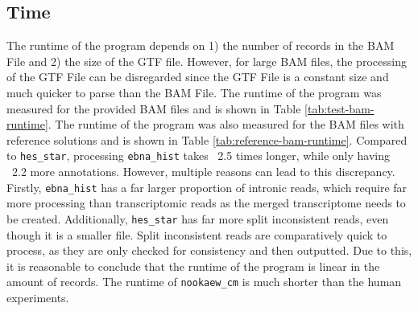 \documentclass{article}
\begin{document}
    \subsection{Time}
    The runtime of the program depends on 1) the number of records in the BAM File and 2) the size of the GTF file. However, for large BAM files, the processing of the GTF File can be disregarded since the GTF File is a constant size and much quicker to parse than the BAM File. The runtime of the program was measured for the provided BAM files and is shown in Table \ref{tab:test-bam-runtime}. The runtime of the program was also measured for the BAM files with reference solutions and is shown in Table \ref{tab:reference-bam-runtime}. Compared to \texttt{hes\_star}, processing \texttt{ebna\_hist} takes ~2.5 times longer, while only having ~2.2 more annotations. However, multiple reasons can lead to this discrepancy. Firstly, \texttt{ebna\_hist} has a far larger proportion of intronic reads, which require far more processing than transcriptomic reads as the merged transcriptome needs to be created. Additionally, \texttt{hes\_star} has far more split inconsistent reads, even though it is a smaller file. Split inconsistent reads are comparatively quick to process, as they are only checked for consistency and then outputted. Due to this, it is reasonable to conclude that the runtime of the program is linear in the amount of records. The runtime of \texttt{nookaew\_cm} is much shorter than the human experiments.



    \begin{table}[]
        \centering
        \caption{List of the BAM files provided with the respective gtf, experiment strandness, and the runtime (excluding GTF Parsing). The BAM file were processed on the bioclient grid (write/read to/from HDD) with -Xmx10g and queued with QueueGridForRefTable.sh}
        \label{tab:test-bam-runtime}
    \end{table}
\end{document}
